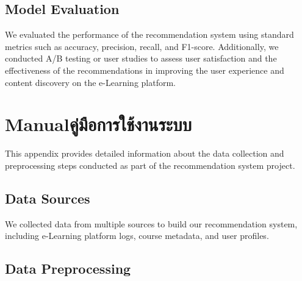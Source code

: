 \section{Model Evaluation}

We evaluated the performance of the recommendation system using standard 
metrics such as accuracy, precision, recall, and F1-score. Additionally, 
we conducted A/B testing or user studies to assess user satisfaction and 
the effectiveness of the recommendations in improving the user experience 
and content discovery on the e-Learning platform.










\chapter{\ifenglish Manual\else คู่มือการใช้งานระบบ\fi}

This appendix provides detailed information about the data collection and 
preprocessing steps conducted as part of the recommendation system project.

\section{Data Sources}

We collected data from multiple sources to build our recommendation system, including 
e-Learning platform logs, course metadata, and user profiles.

\section{Data Preprocessing}

